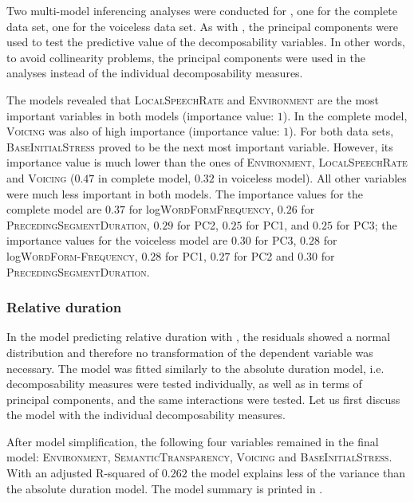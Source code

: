Two multi-model inferencing analyses were conducted for , one for the complete data set, one for the voiceless data set. As with , the principal components were used to test the predictive value of the decomposability variables. In other words, to avoid collinearity problems, the principal components were used in the analyses instead of the individual decomposability measures. 

The models revealed that \textsc{LocalSpeechRate} and \textsc{Environment}  are the most important variables in both models (importance value: $1$). In the complete model, \textsc{Voicing} was also of high importance (importance value: $1$). 
For both data sets, \textsc{BaseInitialStress} proved to be the next most important variable. However, its importance value is much lower than the ones of \textsc{Environment}, \textsc{LocalSpeechRate} and \textsc{Voicing} ($0.47$ in complete model, $0.32$ in voiceless model).
 All other variables were much less important in both models. 
The importance values for the complete model are $0.37$ for log\textsc{WordFormFrequency},  $0.26$ for \textsc{PrecedingSegmentDuration}, $0.29$ for \textsc{PC2}, $0.25$ for \textsc{PC1},  and $0.25$ for \textsc{PC3}; 
 the importance values for the voiceless model are $0.30$ for \textsc{PC3}, $0.28$ for log\textsc{WordForm-Frequency}, $0.28$ for \textsc{PC1}, $0.27$ for \textsc{PC2} and $0.30$ for \textsc{PrecedingSegmentDuration}.



\subsubsection{Relative duration}

In the model predicting relative duration with , the residuals showed a normal distribution and therefore no transformation of the dependent variable was necessary. The model was fitted similarly to the absolute duration model, i.e. decomposability measures were tested individually, as well as in terms of principal components, and the same interactions were tested. Let us first discuss the model with the individual decomposability measures.

After model simplification, the following four variables remained in the final model: \textsc{Environment}, \textsc{SemanticTransparency}, \textsc{Voicing} and \textsc{BaseInitialStress}. With an adjusted R-squared of $0.262$ the model explains less of the variance than the absolute duration model. The model summary is printed in .
  
